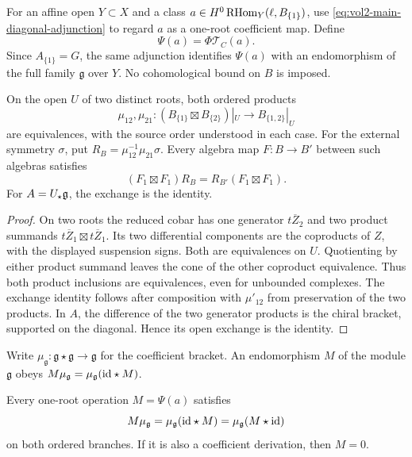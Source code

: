 For an affine open $Y\subset X$ and a class
$a\in H^0\operatorname{RHom}_Y(\ell,B_{\{1\}})$, use
\eqref{eq:vol2-main-diagonal-adjunction} to regard $a$ as a
one-root coefficient map. Define
\[
 \Psi(a)=\Phi\mathcal T_C(a).
\]
Since $A_{\{1\}}=G$, the same adjunction identifies $\Psi(a)$
with an endomorphism of the full family $\mathfrak g$ over $Y$.
No cohomological bound on $B$ is imposed.

\begin{lemma}\label{lem:vol2-cobar-product-exchange}
On the open $U$ of two distinct roots, both ordered products
\[
 \mu_{12},\mu_{21}:
 (B_{\{1\}}\boxtimes B_{\{2\}})|_U\longrightarrow B_{\{1,2\}}|_U
\]
are equivalences, with the source order understood in each case.
For the external symmetry $\sigma$, put
$R_B=\mu_{12}^{-1}\mu_{21}\sigma$.
Every algebra map $F:B\to B'$ between such algebras satisfies
\[
 (F_1\boxtimes F_1)R_B=R_{B'}(F_1\boxtimes F_1).
\]
For $A=U_{\star}\mathfrak g$, the exchange is the identity.
\end{lemma}

\begin{proof}
On two roots the reduced cobar has one generator
$t\overline Z_2$ and two product summands
$t\overline Z_1\boxtimes t\overline Z_1$.
Its two differential components are the coproducts of $Z$,
with the displayed suspension signs.
Both are equivalences on $U$.
Quotienting by either product summand leaves the cone of the other
coproduct equivalence. Thus both product inclusions are equivalences,
even for unbounded complexes.
The exchange identity follows after composition with $\mu'_{12}$
from preservation of the two products.
In $A$, the difference of the two generator products is the
chiral bracket, supported on the diagonal. Hence its open exchange
is the identity.
\end{proof}

Write $\mu_{\mathfrak g}:\mathfrak g\star\mathfrak g\to\mathfrak g$
for the coefficient bracket.
An endomorphism $M$ of the module $\mathfrak g$ obeys
$M\mu_{\mathfrak g}=\mu_{\mathfrak g}(\mathrm{id}\star M)$.

\begin{lemma}\label{lem:vol2-vacuum-module-map}
Every one-root operation $M=\Psi(a)$ satisfies
\begin{equation}\label{eq:vol2-vacuum-module-map}
 M\mu_{\mathfrak g}
 =\mu_{\mathfrak g}(\mathrm{id}\star M)
 =\mu_{\mathfrak g}(M\star\mathrm{id})
\end{equation}
on both ordered branches. If it is also a coefficient derivation,
then $M=0$.
\end{lemma}

